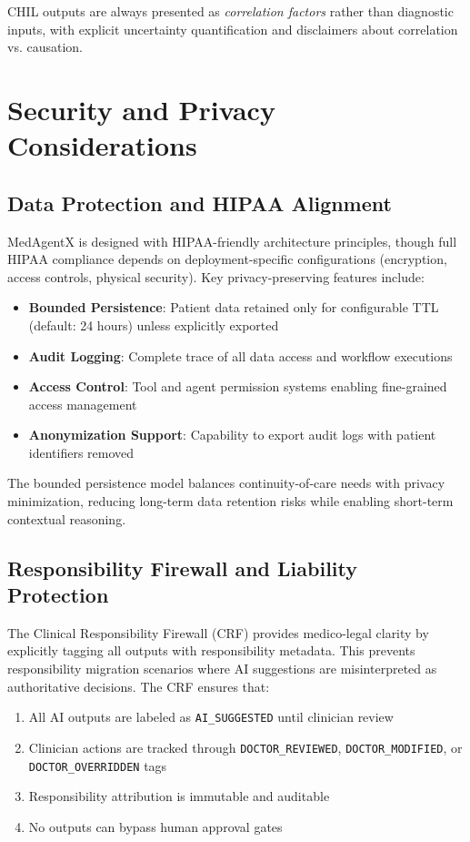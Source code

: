 \documentclass[conference]{IEEEtran}
\begin{document}
CHIL outputs are always presented as \textit{correlation factors} rather than diagnostic inputs, with explicit uncertainty quantification and disclaimers about correlation vs. causation.

\section{Security and Privacy Considerations}

\subsection{Data Protection and HIPAA Alignment}
MedAgentX is designed with HIPAA-friendly architecture principles, though full HIPAA compliance depends on deployment-specific configurations (encryption, access controls, physical security). Key privacy-preserving features include:

\begin{itemize}
    \item \textbf{Bounded Persistence}: Patient data retained only for configurable TTL (default: 24 hours) unless explicitly exported
    \item \textbf{Audit Logging}: Complete trace of all data access and workflow executions
    \item \textbf{Access Control}: Tool and agent permission systems enabling fine-grained access management
    \item \textbf{Anonymization Support}: Capability to export audit logs with patient identifiers removed
\end{itemize}

The bounded persistence model balances continuity-of-care needs with privacy minimization, reducing long-term data retention risks while enabling short-term contextual reasoning.

\subsection{Responsibility Firewall and Liability Protection}
The Clinical Responsibility Firewall (CRF) provides medico-legal clarity by explicitly tagging all outputs with responsibility metadata. This prevents responsibility migration scenarios where AI suggestions are misinterpreted as authoritative decisions. The CRF ensures that:

\begin{enumerate}
    \item All AI outputs are labeled as \texttt{AI\_SUGGESTED} until clinician review
    \item Clinician actions are tracked through \texttt{DOCTOR\_REVIEWED}, \texttt{DOCTOR\_MODIFIED}, or \texttt{DOCTOR\_OVERRIDDEN} tags
    \item Responsibility attribution is immutable and auditable
    \item No outputs can bypass human approval gates
\end{enumerate}
\end{document}
